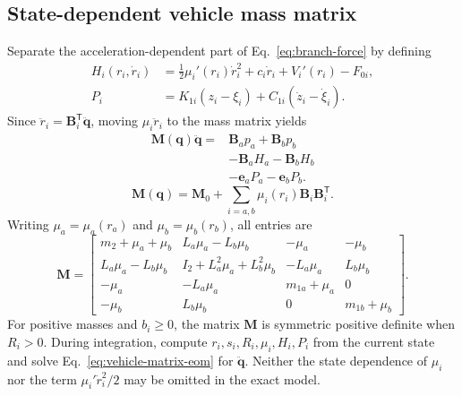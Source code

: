 \documentclass[a4paper,12pt]{article}
\numberwithin{equation}{section}
\newcommand{\vect}[1]{\boldsymbol{#1}}
\begin{document}
\subsection{State-dependent vehicle mass matrix}
Separate the acceleration-dependent part of Eq.~\eqref{eq:branch-force} by defining
\begin{equation}
\begin{aligned}
H_i(r_i,\dot r_i)
 &=\frac12\mu_i'(r_i)\dot r_i^2
   +c_i\dot r_i+V_i'(r_i)-F_{0i},\\
P_i
 &=K_{1i}(z_i-\xi_i)
   +C_{1i}(\dot z_i-\dot\xi_i).
\end{aligned}
\end{equation}
Since $\ddot r_i=\vect B_i^{\mathsf T}\ddot{\vect q}$, moving $\mu_i\ddot r_i$ to the mass matrix yields
\begin{equation}
\boxed{\begin{aligned}
\vect M(\vect q)\ddot{\vect q}
={}&\vect B_ap_a+\vect B_bp_b\\
 &-\vect B_aH_a-\vect B_bH_b\\
 &-\vect e_aP_a-\vect e_bP_b.
\end{aligned}}
\label{eq:vehicle-matrix-eom}
\end{equation}
\begin{equation}
\vect M(\vect q)
=\vect M_0
+\sum_{i=a,b}\mu_i(r_i)\vect B_i\vect B_i^{\mathsf T}.
\label{eq:mass-outer}
\end{equation}
Writing $\mu_a=\mu_a(r_a)$ and $\mu_b=\mu_b(r_b)$, all entries are
\begin{equation}
\vect M=\begin{bmatrix}
m_2+\mu_a+\mu_b & L_a\mu_a-L_b\mu_b & -\mu_a & -\mu_b\\
L_a\mu_a-L_b\mu_b & I_2+L_a^2\mu_a+L_b^2\mu_b & -L_a\mu_a & L_b\mu_b\\
-\mu_a & -L_a\mu_a & m_{1a}+\mu_a & 0\\
-\mu_b & L_b\mu_b & 0 & m_{1b}+\mu_b
\end{bmatrix}.
\label{eq:mass-expanded}
\end{equation}
For positive masses and $b_i\geq0$, the matrix $\vect M$ is symmetric positive definite when $R_i>0$. During integration, compute $r_i,s_i,R_i,\mu_i,H_i,P_i$ from the current state and solve Eq.~\eqref{eq:vehicle-matrix-eom} for $\ddot{\vect q}$. Neither the state dependence of $\mu_i$ nor the term $\mu_i'\dot r_i^2/2$ may be omitted in the exact model.
\end{document}
